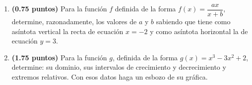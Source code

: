 
\begin{enumerate}[label=\alph*)]
\item \textbf{(0.75 puntos)} Para la función $f$ definida de la forma $f(x)=\dfrac{ax}{x+b}$, determine, razonadamente, los valores de $a$ y $b$ sabiendo que tiene como asíntota vertical la recta de ecuación $x=-2$ y como asíntota horizontal la de ecuación $y=3$.
\item \textbf{(1.75 puntos)} Para la función $g$, definida de la forma $g(x)=x^3-3x^2+2$, determine: su dominio, sus intervalos de crecimiento y decrecimiento y extremos relativos. Con esos datos haga un esbozo de su gráfica.
\end{enumerate}
